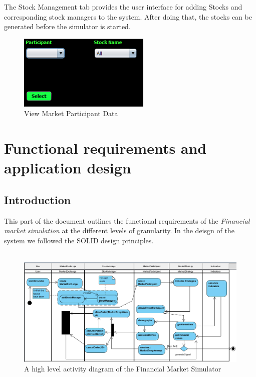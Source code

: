 \documentclass[12pt]{article}
\begin{document}
	The Stock Management tab provides the user interface for adding Stocks and corresponding stock managers to the system. After doing that, the stocks can be generated before the simulator is started.  
            
	\begin{figure}[h!]
	\centering
	\includegraphics[scale=0.8]{./marketparticipantdata}
	\caption{View Market Participant Data}
	\label{Market Participants}
	\end{figure}
            
\newpage
	\section{Functional requirements and application design}
		\subsection{Introduction}	
		This part of the document outlines the functional requirements of the \textit{Financial market simulation} at the different levels of granularity. In the deisgn of the system we followed the SOLID design principles.\\ \\ 
		
			\begin{figure}[th]
			\centering
			\includegraphics[scale=0.6]{./activity}
			\caption{A high level activity diagram of the Financial Market Simulator}
			\label{domain objects}
			\end{figure}
		\pagebreak			    
\end{document}
